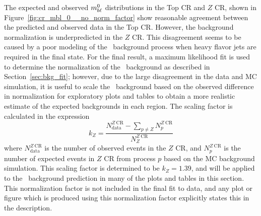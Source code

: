 The expected and observed $m_{b\ell}^{0}$ distributions in the Top CR and $Z$ CR,
shown in Figure~\ref{fig:cr_mbl_0__no_norm_factor} show reasonable agreement
between the predicted and observed data in the Top CR.
However, the background normalization is underpredicted in the $Z$ CR.
This disagreement seems to be caused by a poor modeling of the
\ZGAMMAJETS\ background process when heavy flavor jets are required in the
final state.
For the final result, a maximum likelihood fit is used to determine the
normalization of the \ZGAMMAJETS\ background as described in
Section~\ref{sec:bkg_fit}; however, due to the large disagreement in the
data and MC simulation, it is useful to scale the \ZGAMMAJETS\ background based
on the observed difference in normalization for exploratory plots and tables to
obtain a more realistic estimate of the expected backgrounds in each region.
The scaling factor is calculated in the expression
\begin{equation}
  k_Z = \frac{N_\mathrm{data}^{Z~\mathrm{CR}} -
                \sum_{p \neq Z}N_{p}^{Z~\mathrm{CR}} }
             {N_{Z}^{Z~\mathrm{CR}}}
\end{equation}
where $N_\mathrm{data}^{Z~\mathrm{CR}}$ is the number of observed events in
the $Z$ CR, and $N_{p}^{Z~\mathrm{CR}}$ is the number of expected events in
$Z$ CR from process $p$ based on the MC background simulation.
This scaling factor is determined to be $k_Z = 1.39$, and will be applied to
the \ZGAMMAJETS\ background prediction in many of the plots and tables in this
section.
This normalization factor is not included in the final fit to data, and any plot
or figure which is produced using this normalization factor explicitly
states this in the description.


